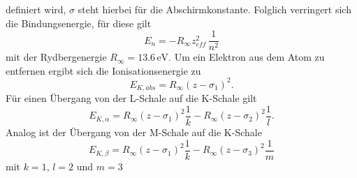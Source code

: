 definiert wird, $\sigma$ steht hierbei für die Abschirmkonstante.
Folglich verringert sich die Bindungsenergie, für diese gilt
\begin{equation}
    E_n = -R_{\infty} z_{eff}^2  \, \frac{1}{n^2}
\end{equation}
mit der Rydbergenergie $R_{\infty} = 13.6 \, \unit{\eV}$. Um ein Elektron aus 
dem Atom zu entfernen ergibt sich die Ionisationsenergie zu
\begin{equation}
    E_{K,abs} = R_{\infty} (z - \sigma_1)^2.
\end{equation}
Für einen Übergang von der L-Schale auf die K-Schale gilt 
\begin{equation}
    E_{K,\alpha} = R_{\infty} (z - \sigma_1)^2 \frac{1}{k} - R_{\infty} (z - \sigma_2)^2 \frac{1}{l}.
\end{equation}
Analog ist der Übergang von der M-Schale auf die K-Schale 
\begin{equation}
    E_{K,\beta} = R_{\infty} (z - \sigma_1)^2 \frac{1}{k} - R_{\infty} (z - \sigma_3)^2 \frac{1}{m}
\end{equation}
mit $k = 1$, $l = 2$ und $m = 3$


